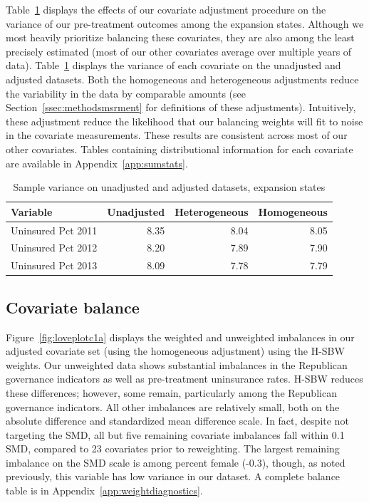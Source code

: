 \documentclass[aoas]{imsart}
\theoremstyle{plain}
\theoremstyle{remark}
\begin{document}
Table~\ref{tab:adjust1} displays the effects of our covariate adjustment procedure on the variance of our pre-treatment outcomes among the expansion states. Although we most heavily prioritize balancing these covariates, they are also among the least precisely estimated (most of our other covariates average over multiple years of data). Table~\ref{tab:adjust1} displays the variance of each covariate on the unadjusted and adjusted datasets. Both the homogeneous and heterogeneous adjustments reduce the variability in the data by comparable amounts (see Section~\ref{ssec:methodsmsrment} for definitions of these adjustments). Intuitively, these adjustment reduce the likelihood that our balancing weights will fit to noise in the covariate measurements. These results are consistent across most of our other covariates. Tables containing distributional information for each covariate are available in Appendix~\ref{app:sumstats}. 

\begin{table}[ht]
\caption{Sample variance on unadjusted and adjusted datasets, expansion states}\label{tab:adjust1}
\begin{tabular}{lrrr}
  \hline
Variable & Unadjusted & Heterogeneous & Homogeneous \\ 
  \hline
Uninsured Pct 2011 & 8.35 & 8.04 & 8.05 \\ 
  Uninsured Pct 2012 & 8.20 & 7.89 & 7.90 \\ 
  Uninsured Pct 2013 & 8.09 & 7.78 & 7.79 \\ 
   \hline
\end{tabular}
\end{table}

\subsection{Covariate balance}

Figure~\ref{fig:loveplotc1a} displays the weighted and unweighted imbalances in our adjusted covariate set (using the homogeneous adjustment) using the H-SBW weights. Our unweighted data shows substantial imbalances in the Republican governance indicators as well as pre-treatment uninsurance rates. H-SBW reduces these differences; however, some remain, particularly among the Republican governance indicators. All other imbalances are relatively small, both on the absolute difference and standardized mean difference scale. In fact, despite not targeting the SMD, all but five remaining covariate imbalances fall within 0.1 SMD, compared to 23 covariates prior to reweighting. The largest remaining imbalance on the SMD scale is among percent female (-0.3), though, as noted previously, this variable has low variance in our dataset. A complete balance table is in Appendix~\ref{app:weightdiagnostics}. 
\end{document}
